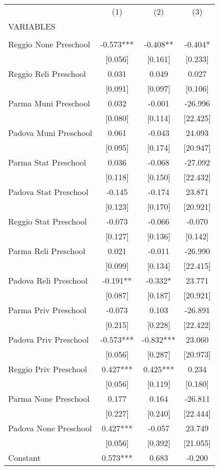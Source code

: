 \begin{tabular}{lccc} \hline
 & (1) & (2) & (3) \\
VARIABLES &  &  &  \\ \hline
 &  &  &  \\
Reggio None Preschool & -0.573*** & -0.408** & -0.404* \\
 & [0.056] & [0.161] & [0.233] \\
Reggio Reli Preschool & 0.031 & 0.049 & 0.027 \\
 & [0.091] & [0.097] & [0.106] \\
Parma Muni Preschool & 0.032 & -0.001 & -26.996 \\
 & [0.080] & [0.114] & [22.425] \\
Padova Muni Preschool & 0.061 & -0.043 & 24.093 \\
 & [0.095] & [0.174] & [20.947] \\
Parma Stat Preschool & 0.036 & -0.068 & -27.092 \\
 & [0.118] & [0.150] & [22.432] \\
Padova Stat Preschool & -0.145 & -0.174 & 23.871 \\
 & [0.123] & [0.170] & [20.921] \\
Reggio Stat Preschool & -0.073 & -0.066 & -0.070 \\
 & [0.127] & [0.136] & [0.142] \\
Parma Reli Preschool & 0.021 & -0.011 & -26.990 \\
 & [0.099] & [0.134] & [22.415] \\
Padova Reli Preschool & -0.191** & -0.332* & 23.771 \\
 & [0.087] & [0.187] & [20.921] \\
Parma Priv Preschool & -0.073 & 0.103 & -26.891 \\
 & [0.215] & [0.228] & [22.422] \\
Padova Priv Preschool & -0.573*** & -0.832*** & 23.060 \\
 & [0.056] & [0.287] & [20.973] \\
Reggio Priv Preschool & 0.427*** & 0.425*** & 0.234 \\
 & [0.056] & [0.119] & [0.180] \\
Parma None Preschool & 0.177 & 0.164 & -26.811 \\
 & [0.227] & [0.240] & [22.444] \\
Padova None Preschool & 0.427*** & -0.057 & 23.749 \\
 & [0.056] & [0.392] & [21.055] \\
Constant & 0.573*** & 0.683 & -0.200 \\

\end{tabular}
